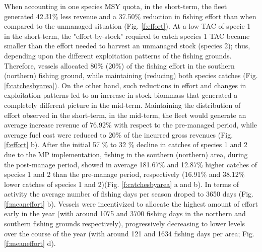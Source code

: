\documentclass[12pt,oneline,a4paper,numbib]{ouparticle}
\numberwithin{equation}{subsection} %
\begin{document}
When accounting in one species MSY quota, in the short-term, the fleet generated 42.31\% less revenue and a 37.50\% reduction in fishing effort than when compared to the unmanaged situation (Fig. \ref{f:effort}). At a low TAC of specie 1 in the short-term, the "effort-by-stock" required to catch species 1 TAC became smaller than the effort needed to harvest an unmanaged stock (species 2); thus, depending upon the different exploitation patterns of the fishing grounds. Therefore, vessels allocated 80\% (20\%) of the fishing effort in the southern (northern) fishing ground, while maintaining (reducing) both species catches (Fig. \ref{f:catchesbyarea}). On the other hand, such reductions in effort and changes in exploitation patterns led to an increase in stock biommass that generated a completely different picture in the mid-term. Maintaining the distribution of effort observed in the short-term, in the mid-term, the fleet would generate an average increase revenue of 76.92\% with respect to the pre-managed period, while average fuel cost were reduced to 20\% of the incurred gross revenues (Fig. \ref{f:effort} b). After the initial 57 \% to 32 \% decline in catches of species 1 and 2 due to the MP implementation, fishing in the southern (northern) area, during the post-manage period, showed in average 181.67\% and 12.87\% higher catches of species 1 and 2 than the pre-manage period, respectively (16.91\% and 38.12\% lower catches of species 1 and 2)(Fig. \ref{f:catchesbyarea} a and b). In terms of activity the average number of fishing days per season droped to 3650 days (Fig. \ref{f:meaneffort} b). Vessels were incentivized to allocate the highest amount of effort early in the year (with around 1075 and 3700 fishing days in the northern and southern fishing grounds respectively), progressively decreasing to lower levels over the course of the year (with around 121 and 1634 fishing days per area; Fig. \ref{f:meaneffort} d).
\end{document}
